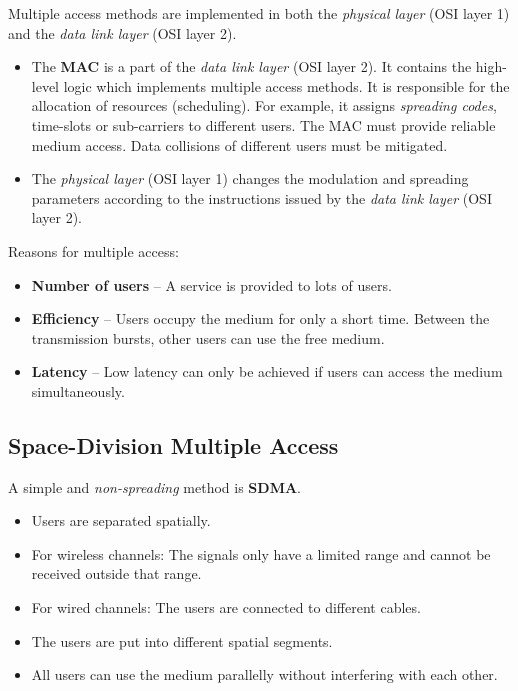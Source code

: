 \begin{refsection}
Multiple access methods are implemented in both the \emph{physical layer} (\acs{OSI} layer 1) and the \emph{data link layer} (\acs{OSI} layer 2).
\begin{itemize}
	\item The  \textbf{\acf{MAC}} is a part of the \emph{data link layer} (\acs{OSI} layer 2). It contains the high-level logic which implements multiple access methods. It is responsible for the allocation of resources (scheduling). For example, it assigns \emph{spreading codes}, time-slots or sub-carriers to different users. The \ac{MAC} must provide reliable medium access. Data collisions of different users must be mitigated.
	\item The \emph{physical layer} (\acs{OSI} layer 1) changes the modulation and spreading parameters according to the instructions issued by the \emph{data link layer} (\acs{OSI} layer 2).
\end{itemize}

Reasons for multiple access:
\begin{itemize}
	\item \textbf{Number of users} -- A service is provided to lots of users.
	\item \textbf{Efficiency} -- Users occupy the medium for only a short time. Between the transmission bursts, other users can use the free medium.
	\item \textbf{Latency} -- Low latency can only be achieved if users can access the medium simultaneously.
\end{itemize}

\subsection{Space-Division Multiple Access}

A simple and \emph{non-spreading} method is  \textbf{\acf{SDMA}}.
\begin{itemize}
	\item Users are separated spatially.
	\item For wireless channels: The signals only have a limited range and cannot be received outside that range.
	\item For wired channels: The users are connected to different cables.
	\item The users are put into different spatial segments.
	\item All users can use the medium parallelly without interfering with each other.
\end{itemize}


\end{refsection}
